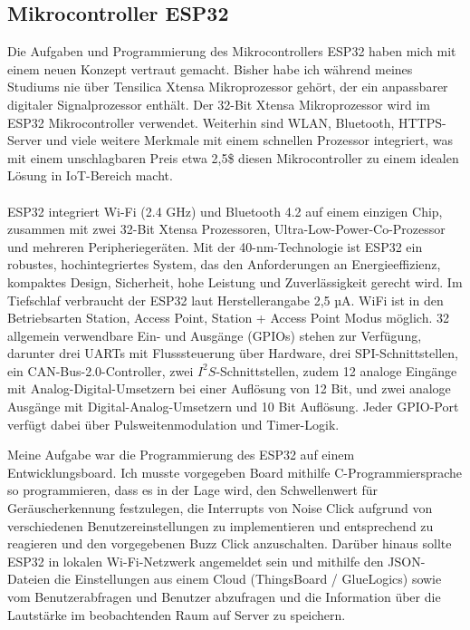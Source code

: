 \subsection{Mikrocontroller ESP32}
Die Aufgaben und Programmierung des Mikrocontrollers ESP32 haben mich mit einem neuen Konzept vertraut gemacht. Bisher habe ich während meines Studiums nie über Tensilica Xtensa Mikroprozessor gehört, der ein anpassbarer digitaler Signalprozessor enthält. Der 32-Bit Xtensa Mikroprozessor wird im ESP32 Mikrocontroller verwendet. Weiterhin sind WLAN, Bluetooth, HTTPS-Server und viele weitere Merkmale mit einem schnellen Prozessor integriert, was mit einem unschlagbaren Preis etwa 2,5\$ diesen Mikrocontroller zu einem idealen Lösung in IoT-Bereich macht.\\\\
ESP32 integriert Wi-Fi (2.4 GHz) und Bluetooth 4.2 auf einem einzigen Chip, zusammen mit zwei 32-Bit Xtensa Prozessoren, Ultra-Low-Power-Co-Prozessor und mehreren Peripheriegeräten. Mit der 40-nm-Technologie ist ESP32 ein robustes, hochintegriertes System, das den Anforderungen an Energieeffizienz, kompaktes Design, Sicherheit, hohe Leistung und Zuverlässigkeit gerecht wird. Im Tiefschlaf verbraucht der ESP32 laut Herstellerangabe 2,5 µA. WiFi ist in den Betriebsarten Station, Access Point, Station + Access Point Modus möglich. 32 allgemein verwendbare Ein- und Ausgänge (GPIOs) stehen zur Verfügung, darunter drei UARTs mit Flusssteuerung über Hardware, drei SPI-Schnittstellen, ein CAN-Bus-2.0-Controller, zwei $I^{2}S$-Schnittstellen, zudem 12 analoge Eingänge mit Analog-Digital-Umsetzern bei einer Auflösung von 12 Bit, und zwei analoge Ausgänge mit Digital-Analog-Umsetzern und 10 Bit Auflösung. Jeder GPIO-Port verfügt dabei über Pulsweitenmodulation und Timer-Logik.

Meine Aufgabe war die Programmierung des ESP32 auf einem Entwicklungsboard. Ich musste vorgegeben Board mithilfe C-Programmiersprache so programmieren, dass es in der Lage wird, den Schwellenwert für Geräuscherkennung festzulegen, die Interrupts von Noise Click aufgrund von verschiedenen Benutzereinstellungen zu implementieren und entsprechend zu reagieren und den vorgegebenen Buzz Click anzuschalten. Darüber hinaus sollte ESP32 in lokalen Wi-Fi-Netzwerk angemeldet sein und mithilfe den JSON-Dateien die Einstellungen aus einem Cloud (ThingsBoard / GlueLogics) sowie vom Benutzerabfragen und Benutzer abzufragen und die Information über die Lautstärke im beobachtenden Raum auf Server zu speichern.   

